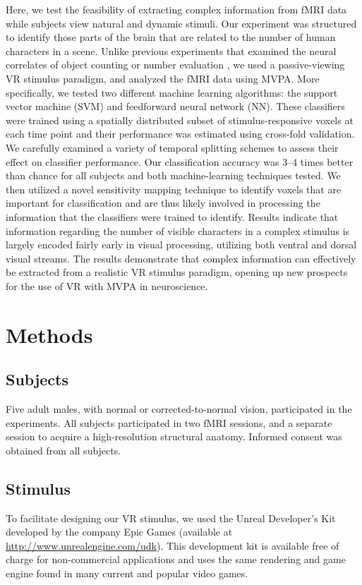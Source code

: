 \documentclass[preprint,5p,authoryear]{elsarticle}
\begin{document}
Here, we test the feasibility of extracting complex information from fMRI data while subjects view natural and dynamic stimuli.
Our experiment was structured to identify those parts of the brain that are related to the number of human characters in a scene.
Unlike previous experiments that examined the neural correlates of object counting or number evaluation \citep{Dehaene1999,Rickard2000,Barth2006}, we used a passive-viewing VR stimulus paradigm, and analyzed the fMRI data using MVPA.
More specifically, we tested two different machine learning algorithms: the support vector machine (SVM) and feedforward neural network (NN).
These classifiers were trained using a spatially distributed subset of stimulus-responsive voxels at each time point and their performance was estimated using cross-fold validation. 
We carefully examined a variety of temporal splitting schemes to assess their effect on classifier performance.
Our classification accuracy was 3--4 times better than chance for all subjects and both machine-learning techniques tested.
We then utilized a novel sensitivity mapping technique to identify voxels that are important for classification and are thus likely involved in processing the information that the classifiers were trained to identify.
Results indicate that information regarding  the number of visible characters in a complex stimulus is largely encoded fairly early in visual processing, utilizing both ventral and dorsal visual streams.
The results demonstrate that complex information can effectively be extracted from a realistic VR stimulus paradigm, opening up new prospects for the use of VR with MVPA in neuroscience.

\section{Methods}

\subsection{Subjects}
Five adult males, with normal or corrected-to-normal vision, participated in the experiments. 
All subjects participated in two fMRI sessions, and a separate session to acquire a high-resolution structural anatomy. 
Informed consent was obtained from all subjects.

\subsection{Stimulus}
To facilitate designing our VR stimulus, we used the Unreal Developer's Kit developed by the company Epic Games (available at \url{http://www.unrealengine.com/udk}).
This development kit is available free of charge for non-commercial applications and uses the same rendering and game engine found in many current and popular video games.
\end{document}
